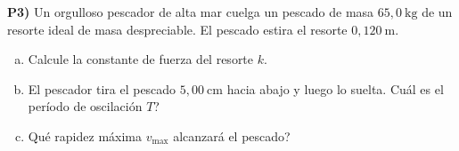 \textbf{P3)} Un orgulloso pescador de alta mar cuelga un pescado de masa $65{,}0\ \text{kg}$ de un resorte ideal de masa despreciable. El pescado estira el resorte $0{,}120\ \text{m}$. 

\begin{enumerate}[a)]
\item Calcule la constante de fuerza del resorte $k$.
\item El pescador tira el pescado $5{,}00\ \text{cm}$ hacia abajo y luego lo suelta. \textquestiondown Cuál es el período de oscilación $T$?
\item \textquestiondown Qué rapidez máxima $v_{\max}$ alcanzará el pescado?
\end{enumerate}

\vspace{0.3cm}

